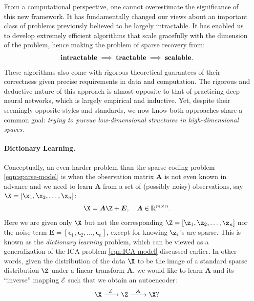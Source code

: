 \documentclass[../../book-main.tex]{subfiles}
\begin{document}
From a computational perspective, one cannot overestimate the significance of this new framework. It has fundamentally changed our views about an important class of problems previously believed to be largely intractable. It has enabled us to develop extremely efficient algorithms that scale gracefully with the dimension of the problem, hence making the problem of sparse recovery from:
\begin{equation}
    \mbox{\textbf{intractable}} \;
   \Longrightarrow \; \mbox{\textbf{tractable}} \; \Longrightarrow \; 
   \mbox{\textbf{scalable}}.
\end{equation}
These algorithms also come with rigorous theoretical guarantees of their correctness given precise requirements in data and computation. The rigorous and deductive nature of this approach is almost opposite to that of practicing deep neural networks, which is largely empirical and inductive. Yet, despite their seemingly opposite styles and standards, we now know both approaches share a common goal: {\em trying to pursue low-dimensional structures in high-dimensional spaces.}

\paragraph{Dictionary Learning.}
Conceptually, an even harder problem than the sparse coding problem \eqref{eqn:sparse-model} is when the observation matrix $\boldsymbol{A}$ is not even known in advance and we need to learn $\boldsymbol{A}$ from a set of (possibly noisy) observations, say $\X = [\x_1, \x_2, \ldots, \x_n]$:
\begin{equation}
    \X = \boldsymbol{A} \Z + \boldsymbol{E}, \quad \boldsymbol{A} \in \mathbb{R}^{m\times n}.
    \label{eqn:dictionary-learning}
\end{equation}
Here we are given only $\X$ but not the corresponding $\Z = [\z_1, \z_2, \ldots, \z_n]$ nor the noise term $\boldsymbol{E}= [\boldsymbol{\epsilon}_1, \boldsymbol{\epsilon}_2, \ldots, \boldsymbol{\epsilon}_n]$, except for knowing $\z_i$'s are sparse. This is known as the {\em dictionary learning} problem, which can be viewed as a generalization of the ICA problem \eqref{eqn:ICA-model} discussed earlier. In other words, given the distribution of the data $\X$ to be the image of a standard sparse distribution $\Z$ under a linear transform $\boldsymbol{A}$, we would like to learn $\boldsymbol{A}$ and its ``inverse'' mapping $\mathcal{E}$ such that we obtain an autoencoder:
\begin{equation}
    \X   \xrightarrow{\hspace{2mm} \mathcal{E} \hspace{2mm}}  \Z \xrightarrow{\hspace{2mm} \boldsymbol{A} \hspace{2mm}} \X?
       \label{eqn:decoding-DL}
\end{equation}
\end{document}
